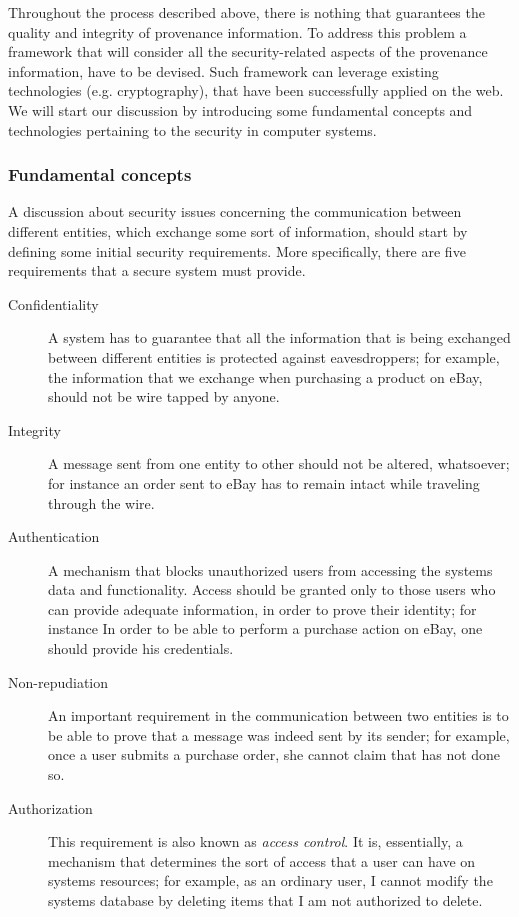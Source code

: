 Throughout the process described above, there is nothing that guarantees the quality and integrity of provenance information. To address this problem a framework that will consider all the security-related aspects of the provenance information, have to be devised. Such framework can leverage existing technologies (e.g. cryptography), that have been successfully applied on the web.
We will start our discussion by introducing some fundamental concepts and technologies pertaining to the security in computer systems.

\subsubsection{Fundamental concepts}

A discussion about security issues concerning the communication between different entities, which exchange some sort of information, should start by defining some initial security requirements. More specifically, there are five requirements that a secure system must provide.

\begin{description}
  \item[Confidentiality]
        A system has to guarantee that all the information that is being exchanged between different entities is protected against eavesdroppers; for example, the information that we exchange when purchasing a product on eBay, should not be wire tapped by anyone.
  \item[Integrity]
        A message sent from one entity to other should not be altered, whatsoever; for instance an order sent to eBay has to remain intact while traveling through the wire.
  \item[Authentication]
        A mechanism that blocks unauthorized users from accessing the systems data and functionality. Access should be granted only to those users who can provide adequate information, in order to prove their identity; for instance In order to be able to perform a purchase action on eBay, one should provide his credentials.
  \item[Non-repudiation]
        An important requirement in the communication between two entities is to be able to prove that a message was indeed sent by its sender; for example, once a user submits a purchase order, she cannot claim that has not done so.
  \item[Authorization]
        This requirement is also known as \emph{access control}. It is, essentially, a mechanism that determines the sort of access that a user can have on systems resources; for example, as an ordinary user, I cannot modify the systems database by deleting items that I am not authorized to delete.
\end{description}

